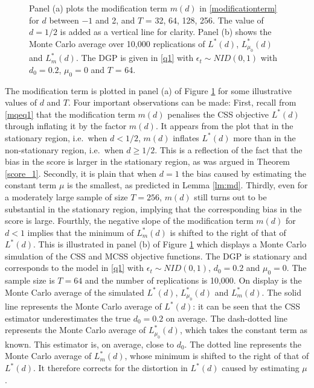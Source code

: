 {{\begin{figure}[H]
  \centering
  \hspace{-1.25ex}
  \caption{Panel (a) plots the modification term $m(d)$ in \eqref{modificationterm} for $d$ between $-1$ and 2, and $T$ = 32, 64, 128, 256. The value of $d = 1/2$ is added as a vertical line for clarity.  Panel (b) shows the Monte
    Carlo average over 10,000 replications of $L^*(d)$, $L_{\mu_0}^*(d)$ and $L_{m}^*(d)$. The DGP is given in \eqref{q1} with $\epsilon_t \sim \textit{NID}(0,1)$ with $d_0 = 0.2$, $\mu_0 = 0$ and $T$ = 64.}
  \label{fig1}\end{figure}





The modification term is plotted in panel (a) of Figure \ref{fig1} for some illustrative values of $d$ and $T$. Four important observations can be made: First, recall from \eqref{mqeq1} that the modification term $m(d)$ penalises
the CSS objective $L^*(d)$ through inflating it by the factor $m(d)$. It appears from the plot that in the stationary region, i.e.\ when $d < 1/2$, $m(d)$ inflates $L^*(d)$ more than in the non-stationary region, i.e.\ when
$d \geq 1/2$. This is a reflection of the fact that the bias in the score is larger in the stationary region, as was argued in Theorem \ref{score_1}.  Secondly, it is plain that when $d = 1$ the bias caused by estimating the
constant term $\mu$ is the smallest, as predicted in Lemma \ref{lm:md}. Thirdly, even for a moderately large sample of size $T = 256$, $m(d)$ still turns out to be substantial in the stationary region, implying that the
corresponding bias in the score is large. Fourthly, the negative slope of the modification term $m(d)$ for $d < 1$ implies that the minimum of $L^*_m(d)$ is shifted to the right of that of $L^*(d)$. This is illustrated in panel
(b) of Figure \ref{fig1} which displays a Monte Carlo simulation of the CSS and MCSS objective functions. The DGP is stationary and corresponds to the model in \eqref{q1} with $\epsilon_t \sim \textit{NID}(0,1)$, $d_0 = 0.2$ and
$\mu_0 = 0$. The sample size is $T = 64$ and the number of replications is 10,000. On display is the Monte Carlo average of the simulated $L^*(d)$, $L^*_{\mu_0}(d)$ and $L_{m}^*(d)$. The solid line represents the Monte Carlo
average of $L^*(d)$: it can be seen that the CSS estimator underestimates the true $d_0 = 0.2$ on average. The dash-dotted line represents the Monte Carlo average of $L_{\mu_0}^*(d)$, which takes the constant term as known. This
estimator is, on average, close to $d_0$. The dotted line represents the Monte Carlo average of $L_{m}^*(d)$, whose minimum is shifted to the right of that of $L^*(d)$. It therefore corrects for the distortion in $L^*(d)$ caused
by estimating $\mu$.



}}
